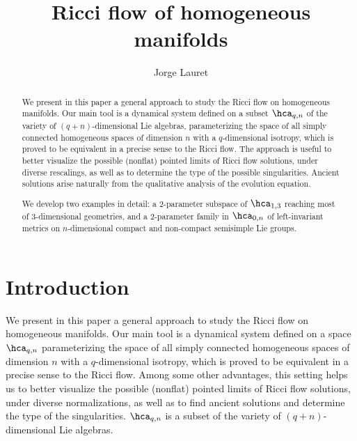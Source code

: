 \documentclass[11pt]{amsart}
\title{Ricci flow of homogeneous manifolds}
\author{Jorge Lauret}
\theoremstyle{plain}
\theoremstyle{definition}
\theoremstyle{remark}
\begin{document}
\maketitle



\begin{abstract}
We present in this paper a general approach to study the Ricci flow on homogeneous manifolds.  Our main tool is a dynamical system defined on a subset $\hca_{q,n}$ of the variety of $(q+n)$-dimensional Lie algebras, parameterizing the space of all simply connected homogeneous spaces of dimension $n$ with a $q$-dimensional isotropy, which is proved to be equivalent in a precise sense to the Ricci flow.  The approach is useful to better visualize the possible (nonflat) pointed limits of Ricci flow solutions, under diverse rescalings, as well as to determine the type of the possible singularities.  Ancient solutions arise naturally from the qualitative analysis of the evolution equation.

We develop two examples in detail: a $2$-parameter subspace of $\hca_{1,3}$ reaching most of $3$-dimensional geometries, and a $2$-parameter family in $\hca_{0,n}$ of left-invariant metrics on $n$-dimensional compact and non-compact semisimple Lie groups.
\end{abstract}

\tableofcontents



\section{Introduction}

We present in this paper a general approach to study the Ricci flow on homogeneous manifolds.  Our main tool is a dynamical system defined on a space $\hca_{q,n}$ parameterizing the space of all simply connected homogeneous spaces of dimension $n$ with a $q$-dimensional isotropy, which is proved to be equivalent in a precise sense to the Ricci flow.  Among some other advantages, this setting helps us to better visualize the possible (nonflat) pointed limits of Ricci flow solutions, under diverse normalizations, as well as to find ancient solutions and determine the type of the singularities.  $\hca_{q,n}$ is a subset of the variety of $(q+n)$-dimensional Lie algebras.
\end{document}
